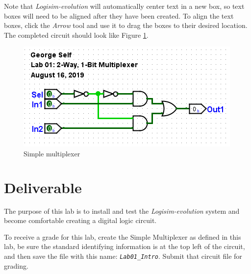 Note that \textit{Logisim-evolution} will automatically center text in a new box, so text boxes will need to be aligned after they have been created. To align the text boxes, click the \textit{Arrow} tool and use it to drag the boxes to their desired location. The completed circuit should look like Figure \ref{fig:intro-08}.

\begin{figure}[H]
	\centering
	\includegraphics[width=\maxwidth{.95\linewidth}]{gfx/intro-08}
	\caption{Simple multiplexer}
	\label{fig:intro-08}
\end{figure}

\section{Deliverable}

The purpose of this lab is to install and test the \textit{Logisim-evolution} system and become comfortable creating a digital logic circuit. 

To receive a grade for this lab, create the Simple Multiplexer as defined in this lab, be sure the standard identifying information is at the top left of the circuit, and then save the file with this name: \textit{\texttt{Lab01\_Intro}}. Submit that circuit file for grading.

